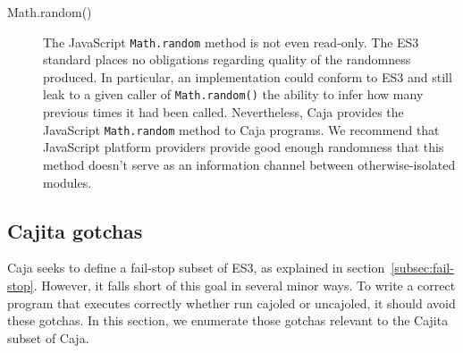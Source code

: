 \documentclass[letterpaper,twocolumn,10pt]{article}
\newcommand{\code}[1]{{\tt {#1}}}              %
\begin{document}
\begin{description}
    \item[Math.random()] The JavaScript \code{Math.random} method is not even 
    read-only. The ES3 standard places no obligations regarding quality of the
    randomness produced. In particular, an implementation could conform to ES3
    and still leak to a given caller of \code{Math.random()} the ability to
    infer how many previous times it had been called. Nevertheless, Caja
    provides the JavaScript \code{Math.random} method to Caja programs. We
    recommend that JavaScript platform providers provide good enough
    randomness that this method doesn't serve as an information channel
    between otherwise-isolated modules.
    
\end{description}


\subsection{Cajita gotchas}
\label{subsec:cajita-gotcha}

Caja seeks to define a fail-stop subset of ES3, as explained in section~\ref{subsec:fail-stop}. However, 
it falls short of this goal in several minor ways. To write a correct program 
that executes correctly whether run cajoled or uncajoled, it should 
avoid these gotchas. In this section, we enumerate those gotchas relevant to 
the Cajita subset of Caja.
\end{document}
